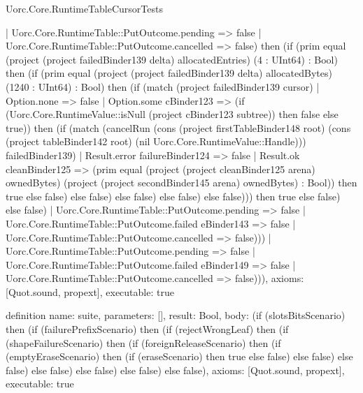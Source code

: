 \begin{lexlean}{Uorc.Core.RuntimeTableCursorTests}
\begin{semanticmodule}
{                    | Uorc.Core.RuntimeTable::PutOutcome.pending => false
                    | Uorc.Core.RuntimeTable::PutOutcome.cancelled => false) then (if (prim equal (project (project failedBinder139 delta) allocatedEntries) (4 : UInt64) : Bool) then (if (prim equal (project (project failedBinder139 delta) allocatedBytes) (1240 : UInt64) : Bool) then (if (match (project failedBinder139 cursor)
                    | Option.none => false
                    | Option.some cBinder123 => (if (Uorc.Core.RuntimeValue::isNull (project cBinder123 subtree)) then false else true)) then (if (match (cancelRun (cons (project firstTableBinder148 root) (cons (project tableBinder142 root) (nil Uorc.Core.RuntimeValue::Handle))) failedBinder139)
                    | Result.error failureBinder124 => false
                    | Result.ok cleanBinder125 => (prim equal (project (project cleanBinder125 arena) ownedBytes) (project (project secondBinder145 arena) ownedBytes) : Bool)) then true else false) else false) else false) else false) else false))) then true else false) else false)
              | Uorc.Core.RuntimeTable::PutOutcome.pending => false
              | Uorc.Core.RuntimeTable::PutOutcome.failed eBinder143 => false
              | Uorc.Core.RuntimeTable::PutOutcome.cancelled => false)))
        | Uorc.Core.RuntimeTable::PutOutcome.pending => false
        | Uorc.Core.RuntimeTable::PutOutcome.failed eBinder149 => false
        | Uorc.Core.RuntimeTable::PutOutcome.cancelled => false))),
  axioms: [Quot.sound, propext],
  executable: true
}

definition{
  name: suite,
  parameters: [],
  result: Bool,
  body: (if (slotsBitsScenario) then (if (failurePrefixScenario) then (if (rejectWrongLeaf) then (if (shapeFailureScenario) then (if (foreignReleaseScenario) then (if (emptyEraseScenario) then (if (eraseScenario) then true else false) else false) else false) else false) else false) else false) else false),
  axioms: [Quot.sound, propext],
  executable: true
}
\end{semanticmodule}
\end{lexlean}
